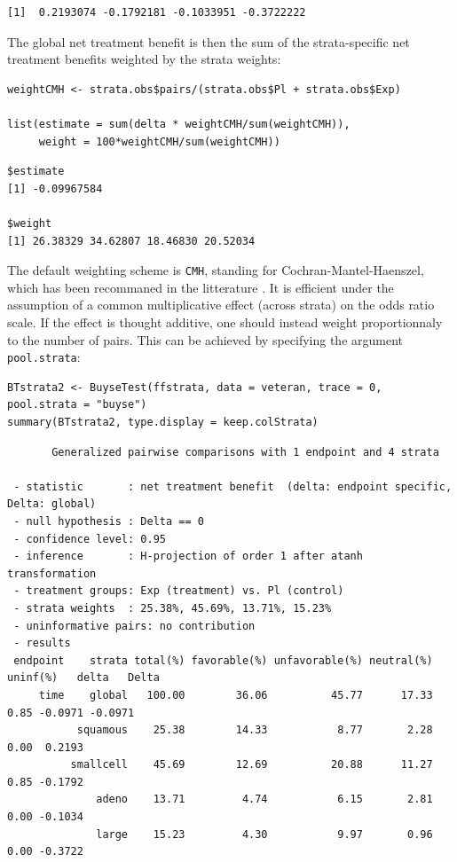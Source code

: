\documentclass[12pt]{article}
\begin{document}
\begin{verbatim}
[1]  0.2193074 -0.1792181 -0.1033951 -0.3722222
\end{verbatim}




The global net treatment benefit is then the sum of the strata-specific net
treatment benefits weighted by the strata weights:
\lstset{language=r,label= ,caption= ,captionpos=b,numbers=none}
\begin{lstlisting}
weightCMH <- strata.obs$pairs/(strata.obs$Pl + strata.obs$Exp)

list(estimate = sum(delta * weightCMH/sum(weightCMH)),
     weight = 100*weightCMH/sum(weightCMH))
\end{lstlisting}

\begin{verbatim}
$estimate
[1] -0.09967584

$weight
[1] 26.38329 34.62807 18.46830 20.52034
\end{verbatim}



\clearpage

The default weighting scheme is \texttt{CMH}, standing for
Cochran-Mantel-Haenszel, which has been recommaned in the litterature
\citep{dong2018stratified}. It is efficient under the assumption of a
common multiplicative effect (across strata) on the odds ratio
scale. If the effect is thought additive, one should instead weight
proportionnaly to the number of pairs. This can be
achieved by specifying the argument \texttt{pool.strata}:

\lstset{language=r,label= ,caption= ,captionpos=b,numbers=none}
\begin{lstlisting}
BTstrata2 <- BuyseTest(ffstrata, data = veteran, trace = 0, pool.strata = "buyse")
summary(BTstrata2, type.display = keep.colStrata)
\end{lstlisting}

\begin{verbatim}
       Generalized pairwise comparisons with 1 endpoint and 4 strata

 - statistic       : net treatment benefit  (delta: endpoint specific, Delta: global) 
 - null hypothesis : Delta == 0 
 - confidence level: 0.95 
 - inference       : H-projection of order 1 after atanh transformation 
 - treatment groups: Exp (treatment) vs. Pl (control) 
 - strata weights  : 25.38%, 45.69%, 13.71%, 15.23% 
 - uninformative pairs: no contribution
 - results
 endpoint    strata total(%) favorable(%) unfavorable(%) neutral(%) uninf(%)   delta   Delta
     time    global   100.00        36.06          45.77      17.33     0.85 -0.0971 -0.0971
           squamous    25.38        14.33           8.77       2.28     0.00  0.2193        
          smallcell    45.69        12.69          20.88      11.27     0.85 -0.1792        
              adeno    13.71         4.74           6.15       2.81     0.00 -0.1034        
              large    15.23         4.30           9.97       0.96     0.00 -0.3722
\end{verbatim}
\end{document}
